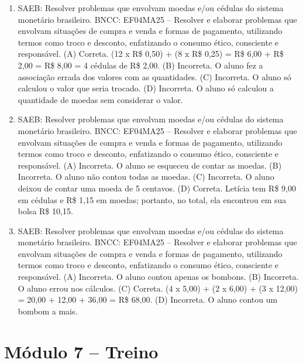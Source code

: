 \begin{enumerate}
\item
SAEB: Resolver problemas que envolvam moedas e/ou cédulas do sistema monetário brasileiro.
BNCC: EF04MA25 -- Resolver e elaborar problemas que envolvam situações de compra e venda e formas
de pagamento, utilizando termos como troco e desconto, enfatizando o consumo ético, consciente e
responsável.
(A) Correta. (12 x R\$ 0,50) + (8 x R\$ 0,25) = R\$ 6,00 + R\$ 2,00 = R\$ 8,00 = 4 cédulas de R\$ 2,00.
(B) Incorreta. O aluno fez a associação errada dos valores com as quantidades.
(C) Incorreta. O aluno só calculou o valor que seria trocado.
(D) Incorreta. O aluno só calculou a quantidade de moedas sem considerar o valor.

\item
SAEB: Resolver problemas que envolvam moedas e/ou cédulas do sistema monetário brasileiro.
BNCC: EF04MA25 -- Resolver e elaborar problemas que envolvam situações de compra e venda e formas
de pagamento, utilizando termos como troco e desconto, enfatizando o consumo ético, consciente e
responsável.
(A) Incorreta. O aluno se esqueceu de contar as moedas.
(B) Incorreta. O aluno não contou todas as moedas.
(C) Incorreta. O aluno deixou de contar uma moeda de 5 centavos.
(D) Correta. Letícia tem R\$ 9,00 em cédulas e R\$ 1,15 em moedas; portanto, no total, ela
encontrou em sua bolsa R\$ 10,15.

\item
SAEB: Resolver problemas que envolvam moedas e/ou cédulas do sistema monetário brasileiro.
BNCC: EF04MA25 -- Resolver e elaborar problemas que envolvam situações de compra e venda e formas
de pagamento, utilizando termos como troco e desconto, enfatizando o consumo ético, consciente e
responsável.
(A) Incorreta. O aluno contou apenas os bombons.
(B) Incorreta. O aluno errou nos cálculos.
(C) Correta. (4 x 5,00) + (2 x 6,00) + (3 x 12,00) = 20,00 + 12,00 + 36,00 = R\$ 68,00.
(D) Incorreta. O aluno contou um bombom a mais.
\end{enumerate}

\section*{Módulo 7 – Treino}


